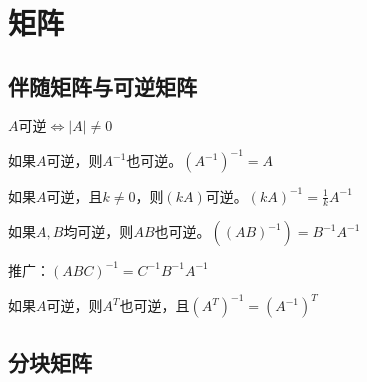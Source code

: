 \section{矩阵}

\subsection{伴随矩阵与可逆矩阵}

$A \mbox{可逆} \Longleftrightarrow |A| \neq 0 $

$\mbox{如果}A\mbox{可逆，则}A^{-1}\mbox{也可逆。} (A^{-1})^{-1} = A$

$\mbox{如果}A\mbox{可逆，且}k \neq 0\mbox{，则}(kA)\mbox{可逆。} (kA)^{-1} = \frac{1}{k}A^{-1}$


$\mbox{如果}A, B\mbox{均可逆，则}AB\mbox{也可逆。} ((AB)^{-1}) = B^{-1}A^{-1}$

$\mbox{推广：}(ABC)^{-1}=C^{-1}B^{-1}A^{-1}$


$\mbox{如果}A\mbox{可逆，则}A^{T}\mbox{也可逆，且} (A^{T})^{-1} = (A^{-1})^T$


\subsection{分块矩阵}

